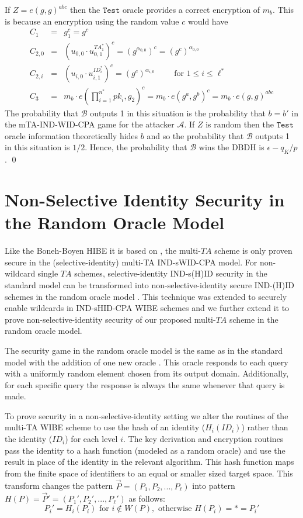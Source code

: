 \documentclass[10pt]{llncs}
\newcommand{\A}{\mathcal{A}}
\newcommand{\B}{\mathcal{B}}
\newcommand{\ID}{\mathit{ID}}
\newcommand{\TA}{\mathit{TA}}
\newcommand{\pk}{\mathit{pk}}
\begin{document}
If $Z=e(g,g)^{abc}$ then the $\texttt{Test}$ oracle provides a correct encryption of $m_{b}$. This is because an encryption using the random value $c$ would have 
\begin{eqnarray*}
C_{1} &=& g_{1}^{c}=g^{c}\\
C_{2,0} &=& (u_{0,0} \cdot u_{0,1}^{\TA^{*}_{1}})^{c} = (g^{\alpha_{0,0}})^{c} = (g^{c})^{\alpha_{0,0}}\\
C_{2,i} &=& (u_{i,0} \cdot u_{i,1}^{\ID^{*}_{i}})^{c} = (g^{c})^{\alpha_{i,0}} \qquad \mbox{ for } 1\leq i\leq \ell^{*}\\
C_{3} &=& m_{b} \cdot e(\prod_{i=1}^{n^{*}} \pk_i,g_{2})^{c}
= m_{b} \cdot e(g^{a},g^{b})^{c} = m_{b} \cdot e(g,g)^{abc}
\end{eqnarray*}
The probability that $\B$ outputs 1 in this situation is the probability that $b=b'$ in the mTA-IND-WID-CPA game for the attacker $\A$. If $Z$ is random then the $\texttt{Test}$ oracle information theoretically hides $b$ and so the probability that $\B$ outputs 1 in this situation is $1/2$. Hence, the probability that $\B$ wins the DBDH is $\epsilon-q_{K}/p$. \qed


\section{Non-Selective Identity Security in the Random Oracle Model}

Like the Boneh-Boyen HIBE it is based on \cite{Boneh04}, the multi-$\TA$ scheme is only proven secure in the (selective-identity) multi-TA IND-sWID-CPA model. For non-wildcard single $\TA$ schemes, selective-identity IND-s(H)ID security in the standard model can be transformed into non-selective-identity secure IND-(H)ID schemes in the random oracle model \cite{Boneh05}. This technique was extended to securely enable wildcards in IND-sHID-CPA WIBE schemes \cite{Abdalla06} and we further extend it to prove non-selective-identity security of our proposed multi-$\TA$ scheme in the random oracle model.

The security game in the random oracle model is the same as in the standard model with the addition of one new oracle \cite{Bellare93}. This oracle responds to each query with a uniformly random element chosen from its output domain. Additionally, for each specific query the response is always the same whenever that query is made. 

To prove security in a non-selective-identity setting we alter the routines of the multi-TA WIBE scheme to use the hash of an identity ($H_i(\ID_i)$) rather than the identity ($\ID_i$) for each level $i$.  The key derivation and encryption routines pass the identity to a hash function (modeled as a random oracle) and use the result in place of the identity in the relevant algorithm. This hash function maps from the finite space of identifiers to an equal or smaller sized target space. This transform changes the pattern $\vec{P} = (P_1, P_2, ..., P_\ell)$ into pattern $H(P) = \vec{P}' = (P_1', P_2', ..., P_\ell')$ as follows:
$$P_i' = H_i(P_i) \textrm{ for } i \notin W(P), \textrm{ otherwise } H(P_i) = * = P_i'$$
\end{document}
